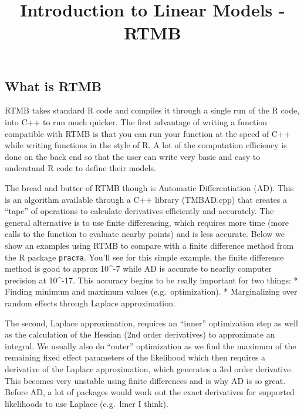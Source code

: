 \documentclass[
]{article}
\title{Introduction to Linear Models - RTMB}
\author{}
\date{\vspace{-2.5em}}
\begin{document}
\maketitle

{
\setcounter{tocdepth}{2}
\tableofcontents
}
\newcommand{\s}{\boldsymbol{s}}

\clearpage

\hypertarget{what-is-rtmb}{%
\subsection{What is RTMB}\label{what-is-rtmb}}

RTMB takes standard R code and compiles it through a single run of the R
code, into C++ to run much quicker. The first advantage of writing a
function compatible with RTMB is that you can run your function at the
speed of C++ while writing functions in the style of R. A lot of the
computation efficiency is done on the back end so that the user can
write very basic and easy to understand R code to define their models.

The bread and butter of RTMB though is Automatic Differentiation (AD).
This is an algorithm available through a C++ library (TMBAD.cpp) that
creates a ``tape'' of operations to calculate derivatives efficiently
and accurately. The general alternative is to use finite differencing,
which requires more time (more calls to the function to evaluate nearby
points) and is less accurate. Below we show an examples using RTMB to
compare with a finite difference method from the R package
\texttt{pracma}. You'll see for this simple example, the finite
difference method is good to approx 10\^{}-7 while AD is accurate to
nearliy computer precision at 10\^{}-17. This accuracy begins to be
really important for two things: * Finding minimum and maximum values
(e.g.~optimization). * Marginalizing over random effects through Laplace
approximation.

The second, Laplace approximation, requires an ``inner'' optimization
step as well as the calculation of the Hessian (2nd order derivatives)
to approximate an integral. We usually also do ``outer'' optimization as
we find the maximum of the remaining fixed effect parameters of the
likelihood which then requires a derivative of the Laplace
approximation, which generates a 3rd order derivative. This becomes very
unstable using finite differences and is why AD is so great. Before AD,
a lot of packages would work out the exact derivatives for supported
likelihoods to use Laplace (e.g.~lmer I think).
\end{document}
